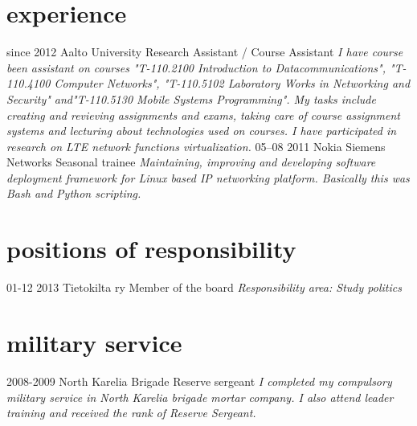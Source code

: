 \documentclass[]{friggeri-cv}
\begin{document}
\section{experience}

\begin{entrylist}
  \entry
    {since 2012}
    {Aalto University}
    {Research Assistant / Course Assistant}
    {\emph{I have course been assistant on courses "T-110.2100 Introduction to Datacommunications", "T-110.4100 Computer Networks", "T-110.5102 Laboratory Works in Networking and Security" and"T-110.5130 Mobile Systems Programming". My tasks include creating and revieving assignments and exams, taking care of course assignment systems and lecturing about technologies used on courses. I have participated in research on LTE network functions virtualization.}}
  \entry
    {05–08 2011}
    {Nokia Siemens Networks}
    {Seasonal trainee}
    {\emph{Maintaining, improving and developing software deployment framework for Linux based IP networking platform. Basically this was Bash and Python scripting.}}
\end{entrylist}

\section{positions of responsibility}
  \begin{entrylist}
    \entry
      {01-12 2013}
      {Tietokilta ry}
      {Member of the board}
      {\emph{Responsibility area: Study politics}}
  \end{entrylist}

\section{military service}
  \begin{entrylist}
    \entry
      {2008-2009}
      {North Karelia Brigade}
      {Reserve sergeant}
      {\emph{I completed my compulsory military service in North Karelia brigade mortar company. I also attend leader training and received the rank of Reserve Sergeant.}}
  \end{entrylist}
\end{document}
